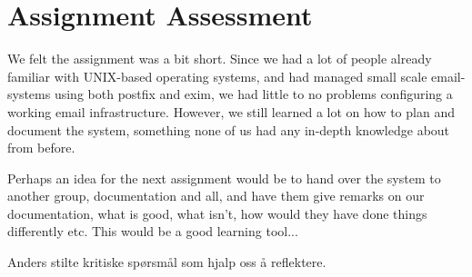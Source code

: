 \section{Assignment Assessment}

We felt the assignment was a bit short. Since we had a lot of people
already familiar with UNIX-based operating systems, and had managed
small scale email-systems using both postfix and exim, we had little to
no problems configuring a working email infrastructure. However, we
still learned a lot on how to plan and document the system, something
none of us had any in-depth knowledge about from before. 

Perhaps an idea for the next assignment would be to hand over the system
to another group, documentation and all, and have them give remarks on
our documentation, what is good, what isn't, how would they have done
things differently etc. This would be a good learning tool...

Anders stilte kritiske spørsmål som hjalp oss å reflektere.
